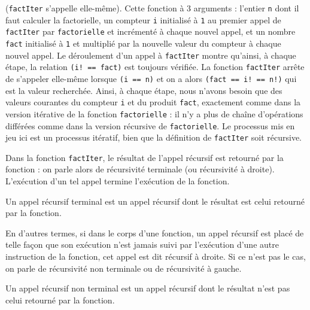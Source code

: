 ({\tt factIter} s'appelle elle-même). Cette fonction à 3 arguments : l'entier {\tt n} 
dont il faut calculer la factorielle, un compteur {\tt i} initialisé à {\tt 1}
au premier appel de {\tt factIter} par {\tt factorielle} et incrémenté à chaque
nouvel appel, et un nombre {\tt fact} initialisé à {\tt 1} et multiplié
par la nouvelle valeur du compteur à chaque nouvel appel. Le déroulement
d'un appel à {\tt factIter} montre qu'ainsi, à chaque étape, la relation
{\tt (i! == fact)} est toujours vérifiée. La fonction {\tt factIter}
arrête de s'appeler elle-même lorsque {\tt (i == n)} et on a alors 
{\tt (fact == i! == n!)} qui est la valeur recherchée. Ainsi, à chaque étape,
nous n'avons besoin que des valeurs courantes du compteur {\tt i} 
et du produit {\tt fact},
exactement comme dans la version itérative de la fonction {\tt factorielle} :
il n'y a plus de chaîne d'opérations différées comme dans la version récursive
de {\tt factorielle}. Le processus mis en jeu ici est un processus itératif, 
bien que la définition de {\tt factIter} soit récursive.

Dans la fonction {\tt factIter}, le résultat de l'appel récursif est
retourné par la fonction : on parle alors de récursivité terminale (ou récursivité à droite).
L'exécution d'un tel appel termine l'exécution de la fonction.

\begin{defin}
Un appel récursif terminal est un appel récursif dont le résultat est celui 
retourné par la fonction.
\end{defin}

En d'autres termes, si dans le corps d'une fonction, un appel récursif 
est placé de telle façon que son exécution n'est jamais suivi par l'exécution 
d'une autre instruction de la fonction, cet appel est dit récursif
à droite. Si ce n'est pas le cas, on parle de récursivité non terminale ou de récursivité à gauche.

\begin{defin}
Un appel récursif non terminal est un appel récursif dont le résultat 
n'est pas celui retourné par la fonction.
\end{defin}


